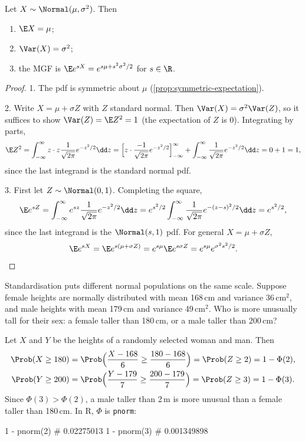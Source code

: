 \begin{theorem}\label{thm:normal-properties}
Let $X \sim \Normal(\mu, \sigma^2)$. Then
\begin{enumerate}
  \item $\E X = \mu$;
  \item $\Var(X) = \sigma^2$;
  \item the MGF is $\E e^{sX} = e^{s\mu + s^2\sigma^2/2}$ for $s \in \R$.
\end{enumerate}
\end{theorem}

\begin{proof}
1. The pdf is symmetric about $\mu$ (\cref{prop:symmetric-expectation}).

2. Write $X = \mu + \sigma Z$ with $Z$ standard normal. Then $\Var(X) = \sigma^2 \Var(Z)$, so it suffices to show $\Var(Z) = \E Z^2 = 1$ (the expectation of $Z$ is 0). Integrating by parts,
\[
  \E Z^2 = \int_{-\infty}^\infty z \cdot z \frac{1}{\sqrt{2\pi}} e^{-z^2/2} \dd z = \Bigl[z \cdot \frac{-1}{\sqrt{2\pi}} e^{-z^2/2}\Bigr]_{-\infty}^\infty + \int_{-\infty}^\infty \frac{1}{\sqrt{2\pi}} e^{-z^2/2} \dd z = 0 + 1 = 1,
\]
since the last integrand is the standard normal pdf.

3. First let $Z \sim \Normal(0, 1)$. Completing the square,
\[
  \E e^{sZ} = \int_{-\infty}^\infty e^{sz} \frac{1}{\sqrt{2\pi}} e^{-z^2/2} \dd z = e^{s^2/2} \int_{-\infty}^\infty \frac{1}{\sqrt{2\pi}} e^{-(z - s)^2/2} \dd z = e^{s^2/2},
\]
since the last integrand is the $\Normal(s, 1)$ pdf. For general $X = \mu + \sigma Z$,
\[
  \E e^{sX} = \E e^{s(\mu + \sigma Z)} = e^{s\mu} \E e^{s\sigma Z} = e^{s\mu} e^{\sigma^2 s^2/2}. \qedhere
\]
\end{proof}

\begin{example}\label{ex:standardisation-heights}
Standardisation puts different normal populations on the same scale. Suppose female heights are normally distributed with mean 168\,cm and variance 36\,cm$^2$, and male heights with mean 179\,cm and variance 49\,cm$^2$. Who is more unusually tall for their sex: a female taller than 180\,cm, or a male taller than 200\,cm?
\end{example}

\begin{solution}
Let $X$ and $Y$ be the heights of a randomly selected woman and man. Then
\begin{align*}
  \Prob(X \ge 180) &= \Prob\Bigl(\frac{X - 168}{6} \ge \frac{180 - 168}{6}\Bigr) = \Prob(Z \ge 2) = 1 - \Phi(2), \\
  \Prob(Y \ge 200) &= \Prob\Bigl(\frac{Y - 179}{7} \ge \frac{200 - 179}{7}\Bigr) = \Prob(Z \ge 3) = 1 - \Phi(3).
\end{align*}
Since $\Phi(3) > \Phi(2)$, a male taller than 2\,m is more unusual than a female taller than 180\,cm. In R, $\Phi$ is \texttt{pnorm}:
\begin{rcode}
1 - pnorm(2)    # 0.02275013
1 - pnorm(3)    # 0.001349898
\end{rcode}
\end{solution}

